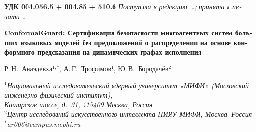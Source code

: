 \documentclass[12pt,a4paper]{article}
\theoremstyle{definition}
\theoremstyle{remark}
\begin{document}
\thispagestyle{empty}


\begin{otherlanguage}{russian}
\noindent\textbf{УДК 004.056.5 + 004.85 + 510.6}
\hfill
\textit{Поступила в редакцию \ldots; принята к печати \ldots}

\vspace{0.8em}

\begin{center}
{\large\bfseries
ConformalGuard: Сертификация безопасности многоагентных
систем больших языковых моделей без предположений о
распределении на основе конформного предсказания на
динамических графах исполнения
\par}

\vspace{0.6em}

{\normalsize
Р.\,Н.~Анаэдевха$^{1,*}$, А.\,Г.~Трофимов$^{1}$, Ю.\,В.~Бородачёв$^{2}$
\par}

\vspace{0.4em}

{\small\itshape
$^{1}$Национальный исследовательский ядерный университет «МИФИ»
(Московский инженерно-физический институт),\\
Каширское шоссе, д.~31, 115409 Москва, Россия\\
$^{2}$Центр исследований искусственного интеллекта НИЯУ МИФИ,
Москва, Россия\\
$^{*}$ar006@campus.mephi.ru
\par}
\end{center}

\vspace{0.5em}


\end{otherlanguage}
\end{document}
